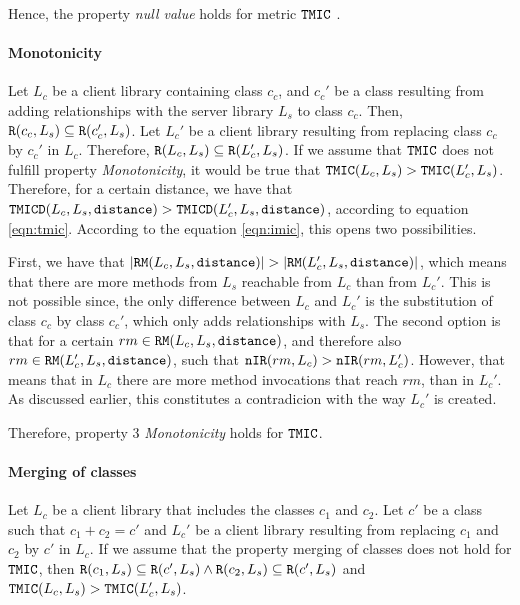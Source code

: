 Hence, the property \textit{null value} holds for metric $\verb|TMIC|$ .

\paragraph{Monotonicity}
Let $L_c$ be a client library containing class $c_c$, and $c_c'$ be a class resulting from adding relationships with the server library $L_s$ to class $c_c$. Then, $\verb|R|(c_c, L_s) \subseteq \verb|R|(c_c', L_s)$. Let $L_c'$ be a client library resulting from replacing class $c_c$ by $c_c'$ in $L_c$. Therefore, $\verb|R|(L_c, L_s) \subseteq \verb|R|(L_c', L_s)$. If we assume that $\verb|TMIC|$ does not fulfill property \textit{Monotonicity}, it would be true that $\verb|TMIC|(L_c, L_s) > \verb|TMIC|(L_c', L_s)$. Therefore, for a certain distance, we have that $\verb|TMICD|(L_c,L_s,\verb|distance|) > \verb|TMICD|(L_c',L_s,\verb|distance|)$, according to equation \ref{eqn:tmic}. According to the equation \ref{eqn:imic}, this opens two possibilities.

First, we have that $|\verb|RM|(L_c,L_s,\verb|distance|)| > |\verb|RM|(L_c',L_s,\verb|distance|)|$, which means that there are more methods from $L_s$ reachable from $L_c$ than from $L_c'$. This is not possible since, the only difference between $L_c$ and $L_c'$ is the substitution of class $c_c$ by class $c_c'$, which only adds relationships with $L_s$. The second option is that for a certain $rm \in \verb|RM|(L_c,L_s,\verb|distance|)$, and therefore also $rm \in \verb|RM|(L_c',L_s,\verb|distance|)$, such that   $\verb|nIR|(rm,L_c) > \verb|nIR|(rm,L_c')$. However, that means that in $L_c$ there are more method invocations that reach $rm$, than in $L_c'$. As discussed earlier, this constitutes a contradicion with the way $L_c'$ is created.

Therefore, property 3 \textit{Monotonicity} holds for $\verb|TMIC|$.

\paragraph{Merging of classes}
Let $L_c$ be a client library that includes the classes $c_1$ and $c_2$. Let $c'$ be a class such that $c_1 + c_2 = c'$ and $L_c'$ be a client library resulting from replacing $c_1$ and $c_2$ by $c'$ in $L_c$. If we assume that the property merging of classes does not hold for $\verb|TMIC|$, then $\verb|R|(c_1, L_s) \subseteq \verb|R|(c', L_s) \land \verb|R|(c_2, L_s) \subseteq \verb|R|(c', L_s)$ and $\verb|TMIC|(L_c, L_s) > \verb|TMIC|(L_c', L_s)$.

